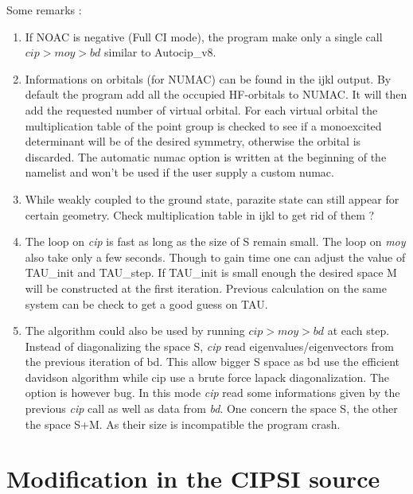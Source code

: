 \documentclass[a4paper,10pt]{article}
\begin{document}
Some remarks : 
\begin{enumerate}
 \item If NOAC is negative (Full CI mode), the program make only a single call $cip>moy>bd$ similar to Autocip\_v8.
 \item Informations on orbitals (for NUMAC) can be found in the ijkl output. By default the program add all the occupied HF-orbitals to NUMAC. It will then add the requested number of virtual orbital. For each virtual orbital the multiplication table of the point group is checked to see if a monoexcited determinant will be of the desired symmetry, otherwise the orbital is discarded. The automatic numac option is written at the beginning of the namelist and won't be used if the user supply a custom numac.
 \item While weakly coupled to the ground state, parazite state can still appear for certain geometry. Check multiplication table in ijkl to get rid of them ?
 \item The loop on \textit{cip} is fast as long as the size of S remain small. The loop on \textit{moy} also take only a few seconds. Though to gain time one can adjust the value of TAU\_init and TAU\_step. If TAU\_init is small enough the desired space M will be constructed at the first iteration. Previous calculation on the same system can be check to get a good guess on TAU.
 \item The algorithm could also be used by running $cip>moy>bd$ at each step. Instead of diagonalizing the space S, \textit{cip} read eigenvalues/eigenvectors from the previous iteration of bd. This allow bigger S space as bd use the efficient davidson algorithm while cip use a brute force lapack diagonalization. The option is however bug. In this mode \textit{cip} read some informations given by the previous \textit{cip} call as well as data from \textit{bd}. One concern the space S, the other the space S+M. As their size is incompatible the program crash.  
\end{enumerate}

\section{Modification in the CIPSI source}
\end{document}

